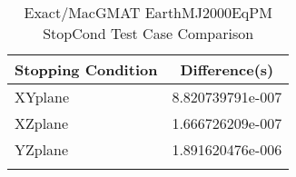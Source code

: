 \begin{table}[htbp!]
\centering
\caption{ Exact/MacGMAT EarthMJ2000EqPM StopCond Test Case Comparison}
      \begin{tabular}{lc}
      \hline\hline
          Stopping Condition & Difference(s) \\
         \hline
         XYplane & 8.820739791e-007 \\
         XZplane & 1.666726209e-007 \\
         YZplane & 1.891620476e-006 \\
      \hline\hline
      \label{Table: Exact-MacGMAT EarthMJ2000EqPM StopCond Table} 
\end{tabular}
\end{table}
